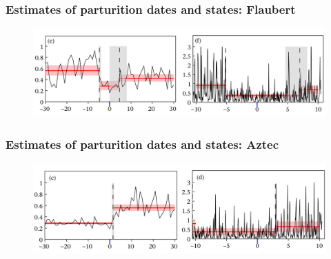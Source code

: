 \documentclass[main.tex]{subfiles}
\begin{document}
\begin{frame}
\frametitle{Estimates of parturition dates and states: Flaubert}

\begin{figure}
    \centering
    \includegraphics[width=1\textwidth]{figures/flaubert.png}
\end{figure}
    
\end{frame}


\begin{frame}
\frametitle{Estimates of parturition dates and states: Aztec}

\begin{figure}
    \centering
    \includegraphics[width=1\textwidth]{figures/aztec.png}
\end{figure}
    
\end{frame}
\end{document}
